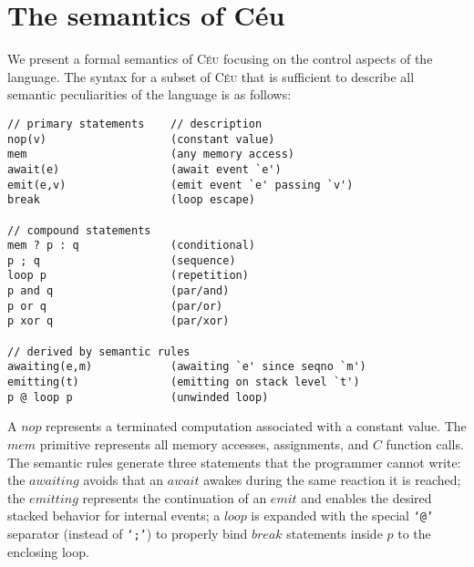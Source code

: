 \documentclass{acm_proc_article-sp}
\newcommand{\CEU}{\textsc{C\'{e}u}\xspace}
\newcommand{\code}[1] {{\small{\texttt{#1}}}}
\newcommand{\1}{\;}
\newcommand{\2}{\;\;}
\newcommand{\3}{\;\;\;}
\newcommand{\5}{\;\;\;\;\;}
\begin{document}
\section{The semantics of C\'eu}
\label{sec.sem}

We present a formal semantics of \CEU focusing on the control aspects of the 
language.
%
%
The syntax for a subset of \CEU that is sufficient to describe all semantic 
peculiarities of the language is as follows:
%
{\small
\begin{verbatim}
// primary statements    // description
nop(v)                   (constant value)
mem                      (any memory access)
await(e)                 (await event `e')
emit(e,v)                (emit event `e' passing `v')
break                    (loop escape)

// compound statements
mem ? p : q              (conditional)
p ; q                    (sequence)
loop p                   (repetition)
p and q                  (par/and)
p or q                   (par/or)
p xor q                  (par/xor)

// derived by semantic rules
awaiting(e,m)            (awaiting `e' since seqno `m')
emitting(t)              (emitting on stack level `t')
p @ loop p               (unwinded loop)
\end{verbatim}
}%
%
A $nop$ represents a terminated computation associated with a constant value.
The $mem$ primitive represents all memory accesses, assignments, and $C$ 
function calls.
%
%
The semantic rules generate three statements that the programmer cannot write:
the $awaiting$ avoids that an $await$ awakes during the same reaction it is 
reached;
the $emitting$ represents the continuation of an $emit$ and enables the desired 
stacked behavior for internal events;
a $loop$ is expanded with the special \code{`@'} separator (instead of 
\code{`;'}) to properly bind $break$ statements inside $p$ to the enclosing 
loop.
\end{document}
